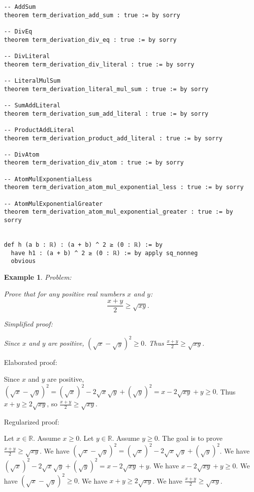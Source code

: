 \documentclass{article}
\newtheorem{example}{Example}
\begin{document}
\begin{tcolorbox}[colback=white!10, width=\linewidth]
\begin{lstlisting}[language=Lean4]
-- AddSum
theorem term_derivation_add_sum : true := by sorry

-- DivEq
theorem term_derivation_div_eq : true := by sorry

-- DivLiteral
theorem term_derivation_div_literal : true := by sorry

-- LiteralMulSum
theorem term_derivation_literal_mul_sum : true := by sorry

-- SumAddLiteral
theorem term_derivation_sum_add_literal : true := by sorry

-- ProductAddLiteral
theorem term_derivation_product_add_literal : true := by sorry

-- DivAtom
theorem term_derivation_div_atom : true := by sorry

-- AtomMulExponentialLess
theorem term_derivation_atom_mul_exponential_less : true := by sorry

-- AtomMulExponentialGreater
theorem term_derivation_atom_mul_exponential_greater : true := by sorry


def h (a b : ℝ) : (a + b) ^ 2 ≥ (0 : ℝ) := by
  have h1 : (a + b) ^ 2 ≥ (0 : ℝ) := by apply sq_nonneg
  obvious

\end{lstlisting}
\end{tcolorbox}


\begin{example}
Problem:
\begin{tcolorbox}[colback=yellow!10, width=\linewidth]
Prove that for any positive real numbers $x$ and $y$:
    $$\frac{x+y}{2} \geq \sqrt{xy}.$$
\end{tcolorbox}

Simplified proof:
\begin{tcolorbox}[colback=blue!10, width=\linewidth]
Since $x$ and $y$ are positive, $(\sqrt x - \sqrt y)^2 \ge 0$. Thus $\frac{x+y}{2} \ge \sqrt{xy}$.
\end{tcolorbox}
\end{example}

Elaborated proof:
\begin{tcolorbox}[colback=green!10, width=\linewidth]
Since $x$ and $y$ are positive, $(\sqrt x - \sqrt y)^2 = (\sqrt x)^2 - 2\sqrt x \sqrt y + (\sqrt y)^2 = x - 2\sqrt{xy} + y \ge 0$. Thus $x + y \ge 2\sqrt{xy}$, so $\frac{x+y}{2} \ge \sqrt{xy}$.
\end{tcolorbox}

Regularized proof:
\begin{tcolorbox}[colback=red!10, width=\linewidth]
Let $x\in\mathbb{R}$. Assume $x\ge 0$.
Let $y\in\mathbb{R}$. Assume $y\ge 0$.
The goal is to prove $\frac{x+y}{2} \ge \sqrt{xy}$.
We have ${{(\sqrt x - \sqrt y)}}^2 = {{(\sqrt x)}}^2 - 2\sqrt x \sqrt y + {{(\sqrt y)}}^2$.
We have ${{(\sqrt x)}}^2 - 2\sqrt x \sqrt y + {{(\sqrt y)}}^2 = x - 2\sqrt{xy} + y$.
We have $x - 2\sqrt{xy} + y \ge 0$.
We have ${{(\sqrt x - \sqrt y)}}^2 \ge 0$.
We have $x + y \ge 2\sqrt{xy}$.
We have $\frac{x+y}{2} \ge \sqrt{xy}$.
\end{tcolorbox}
\end{document}
